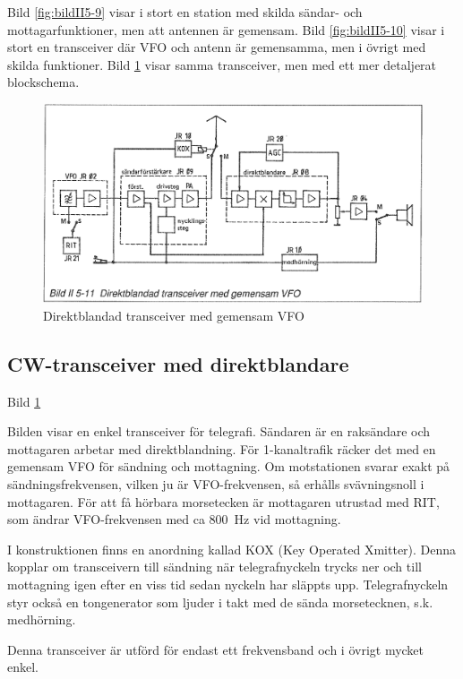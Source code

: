 Bild \ref{fig:bildII5-9} visar i stort en station med skilda sändar- och
mottagarfunktioner, men att antennen är gemensam.  Bild \ref{fig:bildII5-10} visar
i stort en transceiver där VFO och antenn är gemensamma, men i övrigt
med skilda funktioner.  Bild \ref{fig:bildII5-11} visar samma transceiver, men med
ett mer detaljerat blockschema.

\begin{figure}
  \includegraphics[width=\textwidth]{images/bild_2_5-11}
  \caption{Direktblandad transceiver med gemensam VFO}
  \label{fig:bildII5-11}
\end{figure}

\subsection{CW-transceiver med direktblandare}

Bild \ref{fig:bildII5-11}

Bilden visar en enkel transceiver för telegrafi. Sändaren är en
raksändare och mottagaren arbetar med direktblandning. För
1-kanaltrafik räcker det med en gemensam VFO för sändning och
mottagning. Om motstationen svarar exakt på sändningsfrekvensen,
vilken ju är VFO-frekvensen, så erhålls svävningsnoll i
mottagaren. För att få hörbara morsetecken är mottagaren utrustad med
RIT, som ändrar VFO-frekvensen med ca 800~Hz vid mottagning.

I konstruktionen finns en anordning kallad KOX (Key Operated
Xmitter). Denna kopplar om transceivern till sändning när
telegrafnyckeln trycks ner och till mottagning igen efter en viss tid
sedan nyckeln har släppts upp. Telegrafnyckeln styr också en
tongenerator som ljuder i takt med de sända morsetecknen,
s.k. medhörning.

Denna transceiver är utförd för endast ett frekvensband och i övrigt
mycket enkel.

